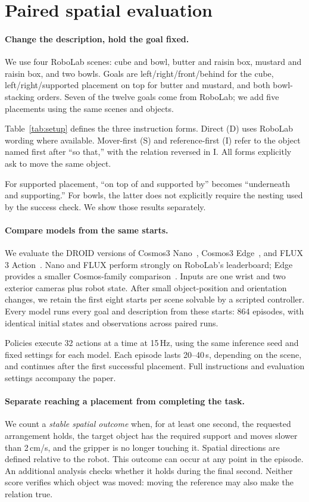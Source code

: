 \documentclass{article}
\begin{document}
\section{Paired spatial evaluation}
\paragraph{Change the description, hold the goal fixed.}
We use four RoboLab scenes: cube and bowl, butter and raisin box, mustard and raisin box, and two bowls. Goals are left/right/front/behind for the cube, left/right/supported placement on top for butter and mustard, and both bowl-stacking orders. Seven of the twelve goals come from RoboLab; we add five placements using the same scenes and objects.

Table~\ref{tab:setup} defines the three instruction forms. Direct (D) uses RoboLab wording where available. Mover-first (S) and reference-first (I) refer to the object named first after ``so that,'' with the relation reversed in I. All forms explicitly ask to move the same object.

For supported placement, ``on top of and supported by'' becomes ``underneath and supporting.'' For bowls, the latter does not explicitly require the nesting used by the success check. We show those results separately.

\paragraph{Compare models from the same starts.}
We evaluate the DROID versions of Cosmos3 Nano~\citep{nvidia2026nano}, Cosmos3 Edge~\citep{nvidia2026edge}, and FLUX 3 Action~\citep{bfl2026fluxaction}. Nano and FLUX perform strongly on RoboLab's leaderboard; Edge provides a smaller Cosmos-family comparison~\citep{robolab2026leaderboard}. Inputs are one wrist and two exterior cameras plus robot state. After small object-position and orientation changes, we retain the first eight starts per scene solvable by a scripted controller. Every model runs every goal and description from these starts: 864 episodes, with identical initial states and observations across paired runs.

Policies execute 32 actions at a time at 15\,Hz, using the same inference seed and fixed settings for each model. Each episode lasts 20--40\,s, depending on the scene, and continues after the first successful placement. Full instructions and evaluation settings accompany the paper.

\paragraph{Separate reaching a placement from completing the task.}
We count a \emph{stable spatial outcome} when, for at least one second, the requested arrangement holds, the target object has the required support and moves slower than 2\,cm/s, and the gripper is no longer touching it. Spatial directions are defined relative to the robot. This outcome can occur at any point in the episode. An additional analysis checks whether it holds during the final second. Neither score verifies which object was moved: moving the reference may also make the relation true.
\end{document}
